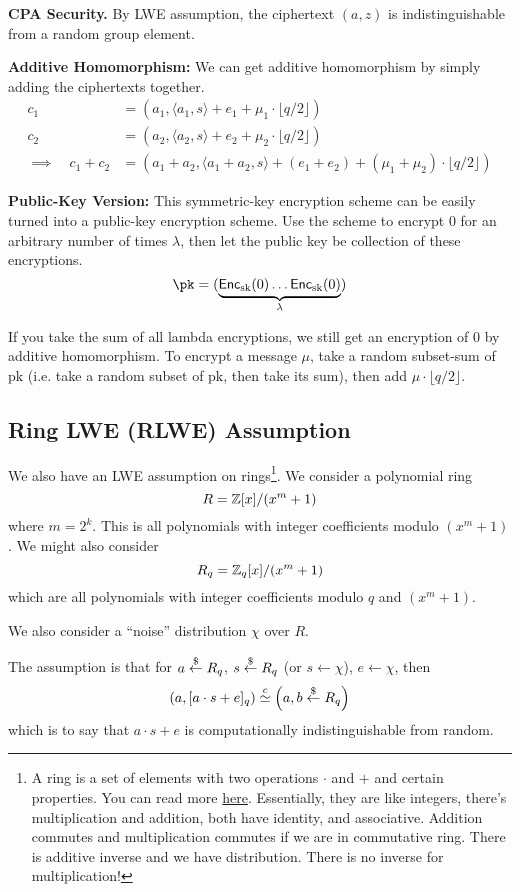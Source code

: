 \textbf{CPA Security.} By LWE assumption, the ciphertext $(a, z)$ is indistinguishable from a random group element.

\textbf{Additive Homomorphism:} We can get additive homomorphism by simply adding the ciphertexts together.
\begin{align*}
    c_1 &= (a_1, \langle a_1, s\rangle + e_1 + \mu_1 \cdot \lfloor q/2 \rfloor)\\
    c_2 &= (a_2, \langle a_2, s \rangle + e_2 + \mu_2 \cdot \lfloor q/2 \rfloor)\\
    \implies \quad c_1 + c_2 &= (a_1 + a_2, \langle a_1 + a_2, s \rangle + (e_1 + e_2) + (\mu_1 + \mu_2) \cdot \lfloor q/2 \rfloor)
\end{align*}

\textbf{Public-Key Version:} This symmetric-key encryption scheme can be easily turned into a public-key encryption scheme. Use the scheme to encrypt 0 for an arbitrary number of times $\lambda$, then let the public key be collection of these encryptions.
\[ \text{\pk} = (\underbrace{\Enc_\text{sk} (0) \dots \Enc_\text{sk} (0)}_{\lambda})\]

If you take the sum of all lambda encryptions, we still get an encryption of 0 by additive homomorphism. To encrypt a message $\mu$, take a random subset-sum of pk (i.e. take a random subset of pk, then take its sum), then add $\mu \cdot \lfloor q/ 2 \rfloor $.

\subsection{Ring LWE (RLWE) Assumption}
We also have an LWE assumption on rings\footnote{A ring is a set of elements with two operations $\cdot$ and $+$ and certain properties. You can read more \href{https://en.wikipedia.org/wiki/Ring_(mathematics)}{here}. Essentially, they are like integers, there's multiplication and addition, both have identity, and associative. Addition commutes and multiplication commutes if we are in commutative ring. There is additive inverse and we have distribution. There is no inverse for multiplication!}. We consider a polynomial ring
\[R = \mathbb Z[x]/(x^m + 1)\]
where $m = 2^k$. This is all polynomials with integer coefficients modulo $(x^m + 1)$. We might also consider
\[R_q = \mathbb Z_q[x] / (x^m + 1)\]
which are all polynomials with integer coefficients modulo $q$ and $(x^m + 1)$.

We also consider a ``noise'' distribution $\chi$ over $R$.

The assumption is that for $a\overset{\$}{\leftarrow} R_q$, $s\overset{\$}{\leftarrow} R_q$ (or $s\leftarrow \chi$), $e\leftarrow \chi$, then
\[\left( a, [a\cdot s + e]_q \right) \overset{c}{\simeq} \left( a, b\overset{\$}{\leftarrow} R_q \right)\]
which is to say that $a\cdot s + e$ is computationally indistinguishable from random.

